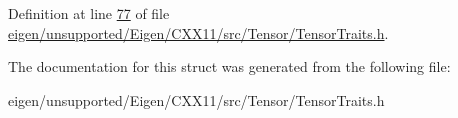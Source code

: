Definition at line \hyperlink{eigen_2unsupported_2_eigen_2_c_x_x11_2src_2_tensor_2_tensor_traits_8h_source_l00077}{77} of file \hyperlink{eigen_2unsupported_2_eigen_2_c_x_x11_2src_2_tensor_2_tensor_traits_8h_source}{eigen/unsupported/\+Eigen/\+C\+X\+X11/src/\+Tensor/\+Tensor\+Traits.\+h}.



The documentation for this struct was generated from the following file\+:\begin{DoxyCompactItemize}
\item 
eigen/unsupported/\+Eigen/\+C\+X\+X11/src/\+Tensor/\+Tensor\+Traits.\+h\end{DoxyCompactItemize}
